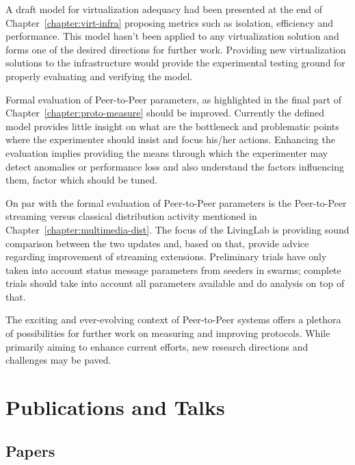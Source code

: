 A draft model for virtualization adequacy had been presented at the end of
Chapter~\ref{chapter:virt-infra} proposing metrics such as isolation,
efficiency and performance. This model hasn't been applied to any
virtualization solution and forms one of the desired directions for further
work. Providing new virtualization solutions to the infrastructure would
provide the experimental testing ground for properly evaluating and verifying
the model.

Formal evaluation of Peer-to-Peer parameters, as highlighted in the final part
of Chapter~\ref{chapter:proto-measure} should be improved. Currently the
defined model provides little insight on what are the bottleneck and
problematic points where the experimenter should insist and focus his/her
actions. Enhancing the evaluation implies providing the means through which
the experimenter may detect anomalies or performance loss and also understand
the factors influencing them, factor which should be tuned.

On par with the formal evaluation of Peer-to-Peer parameters is the
Peer-to-Peer streaming versus classical distribution activity mentioned in
Chapter~\ref{chapter:multimedia-dist}. The focus of the LivingLab is
providing sound comparison between the two updates and, based on that, provide
advice regarding improvement of streaming extensions. Preliminary trials have
only taken into account status message parameters from seeders in swarms;
complete trials should take into account all parameters available and do
analysis on top of that.

The exciting and ever-evolving context of Peer-to-Peer systems offers a
plethora of possibilities for further work on measuring and improving
protocols. While primarily aiming to enhance current efforts, new research
directions and challenges may be paved.

\section{Publications and Talks}
\label{sec:conclusion:publications}

\subsection{Papers}

